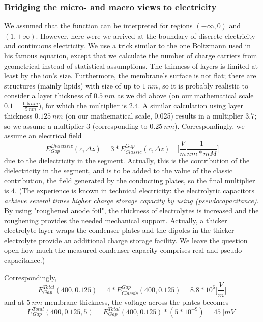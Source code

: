 \subsubsection[Bridging%
]{Bridging the micro- and macro views to electricity\label{sec:Physics-BridgingElectricity}}


We assumed that the function can be interpreted for regions
$(-\infty,0)$ and $(1,+\infty)$. However, here were we arrived at the boundary of discrete electricity and 
continuous electricity.
We use a trick similar to the one Boltzmann used in his famous equation, except that we calculate the number of charge carriers from
geometrical instead of statistical assumptions.
 The thinness of layers is limited at least by the ion's size. Furthermore, the membrane's surface is not flat; there are structures (mainly lipids) with size of up to $1~nm$, so it is probably 
realistic to consider a layer thickness of $0.5~nm$ as we did above
(on our mathematical scale $0.1=\frac{0.5~nm}{5~nm}$), for which the multiplier is $2.4$.
A similar calculation using layer thickness $0.125~nm$ (on our mathematical scale, 0.025) results in a multiplier $3.7$; so we assume a multiplier $3$ (corresponding to $0.25~nm$).
Correspondingly, we assume an electrical field 
\begin{equation}
	E^{Dielectric}_{Gap}(c,\Delta z) = 3*E^{Gap}_{Classic}(c,\Delta z)  \quad 
	\biggl[ \frac{V}{m} \frac{1}{nm*mM} \biggr] \label{eq:SegmentGapField}
\end{equation}
\noindent
due to the dielectricity in the segment.
Actually, this is the contribution of the dielectricity
in the segment, and is to be added to the value of the 
classic contribution,  the 
field generated by the conducting plates, so the 
final multiplier is $4$. 
(The experience
is known in technical electricity: the \href{https://en.wikipedia.org/wiki/Electrolytic_capacitor}{electrolytic capacitors}
\textit{achieve several times higher charge storage capacity by using (\href{https://en.wikipedia.org/wiki/Pseudocapacitance}{pseudocapacitance})}.
By using "roughened anode foil", the thickness of electrolytes is increased and the roughening provides the needed mechanical support. 
Actually, a thicker electrolyte layer wraps the condenser plates and the dipoles in the thicker electrolyte provide an additional charge storage facility. We leave the question open how much the measured condenser capacity comprises real and pseudo capacitance.)


Correspondingly, 
\begin{equation}
E_{Gap}^{Total}(400,0.125)= 4*E^{Gap}_{Classic}(400,0.125) = 8.8*10^6 \bigl[\frac{V}{m}\bigr]\label{eq:ElectricGradient} 
\end{equation}
%
and at $5\ nm$ membrane thickness, the voltage across the plates becomes
%
\begin{equation}
	U_{Gap}^{Total}(400,0.125,5)= E_{Gap}^{Total}(400,0.125) * (5*{10^{-9}}) = 45\ \bigl[mV\bigr]\label{eq:UGapTotal400}
\end{equation}

